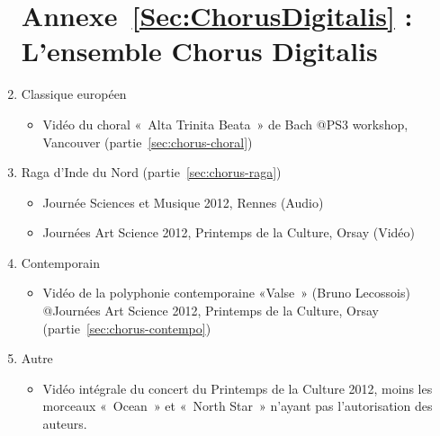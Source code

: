 \begin{enumerate}
\section*{Annexe~\ref{Sec:ChorusDigitalis} : L'ensemble Chorus Digitalis}

\item Classique européen
\label{fav:choral-JAS}
	\begin{itemize}
		\item  Vidéo du choral «~Alta Trinita Beata~» de Bach @PS3 workshop, Vancouver (partie~\ref{sec:chorus-choral})	
	\end{itemize}
\item   Raga d'Inde du Nord (partie~\ref{sec:chorus-raga})
\label{fav:raga}
 	\begin{itemize}
 		\item Journée Sciences et Musique 2012, Rennes (Audio)
 		\item Journées Art Science 2012, Printemps de la Culture, Orsay (Vidéo)
 	\end{itemize}
\item  Contemporain
\label{fav:valse} 
	\begin{itemize}
		\item Vidéo de la polyphonie contemporaine «Valse~» (Bruno Lecossois) @Journées Art Science 2012, Printemps de la Culture, Orsay (partie~\ref{sec:chorus-contempo})
	\end{itemize}
\item  Autre
  	\begin{itemize}
  		\item Vidéo intégrale du concert du Printemps de la Culture 2012, moins les morceaux «~Ocean~» et «~North Star~» n'ayant pas l'autorisation des auteurs.
  	\end{itemize}
\end{enumerate}



